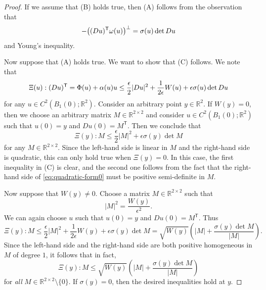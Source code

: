 \documentclass[a4paper]{article}
\newcommand{\R}{\mathbb{R}}
\newcommand{\transpose}{\mathsf{T}}
\let\div\relax\DeclareMathOperator{\div}{div}
\theoremstyle{definition}
\theoremstyle{remark}
\begin{document}
\begin{proof}
If we assume that (B) holds true, then (A) follows from the observation that
\[
-\div\bigl((Du)^\transpose \omega(u)\bigr)^\perp = \sigma(u) \det Du
\]
and Young's inequality.

Now suppose that (A) holds true. We want to show that (C) follows.
We note that
\[
\Xi(u) : (Du)^\transpose = \div \Phi(u) + \alpha(u) \div u \le  \frac{\epsilon}{2} |Du|^2 + \frac{1}{2\epsilon} W(u) + \epsilon \sigma(u) \det Du
\]
for any $u \in C^2(B_1(0); \R^2)$. Consider an arbitrary point $y \in \R^2$.
If $W(y) = 0$, then we choose an arbitrary matrix $M \in \R^{2 \times 2}$ and
consider $u \in C^2(B_1(0); \R^2)$ such that $u(0) = y$ and $Du(0) = M^\transpose$. Then
we conclude that
\begin{equation} \label{eq:quadratic-form0}
\Xi(y) : M \le \frac{\epsilon}{2} |M|^2 + \epsilon \sigma(y) \det M
\end{equation}
for any $M \in \R^{2 \times 2}$. Since the left-hand side is linear in $M$ and the
right-hand side is quadratic, this can only hold true when $\Xi(y) = 0$. In this case,
the first inequality in (C) is clear, and the second one follows from the fact that
the right-hand side of \eqref{eq:quadratic-form0} must be positive semi-definite in $M$.

Now suppose that $W(y) \neq 0$. Choose a matrix $M \in \R^{2 \times 2}$ such that
\[
|M|^2 = \frac{W(y)}{\epsilon^2}.
\]
We can again choose $u$ such that $u(0) = y$ and $Du(0) = M^\transpose$. Thus
\[
\Xi(y) : M \le  \frac{\epsilon}{2} |M|^2 + \frac{1}{2\epsilon} W(y) + \epsilon \sigma(y) \det M = \sqrt{W(y)} \left(|M| + \frac{\sigma(y) \det M}{|M|}\right).
\]
Since the left-hand side and the right-hand side are both positive homogeneous
in $M$ of degree $1$, it follows that in fact,
\[
\Xi(y) : M \le \sqrt{W(y)} \left(|M| + \frac{\sigma(y) \det M}{|M|}\right)
\]
for \emph{all} $M \in \R^{2 \times 2} \setminus \{0\}$. If $\sigma(y) = 0$, then the desired inequalities hold at $y$.


\end{proof}
\end{document}
